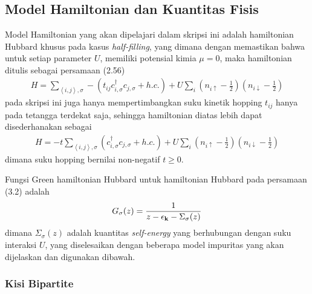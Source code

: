 \chapter{\babTiga}

\section{Model Hamiltonian dan Kuantitas Fisis}

Model Hamiltonian yang akan dipelajari dalam skripsi ini adalah hamiltonian Hubbard khusus pada kasus \textit{half-filling}, yang dimana dengan memastikan bahwa untuk setiap parameter $U$, memiliki potensial kimia $\mu = 0$, maka hamiltonian ditulis sebagai persamaan (2.56)
\begin{align}
H = \sum_{\left< i,j \right> , \sigma} -\left(t_{ij} c^\dagger_{i,\sigma}c_{j,\sigma} + h.c. \right) + U \sum_i \left( n_{i\uparrow} - \frac{1}{2}\right) \left(n_{i\downarrow} - \frac{1}{2} \right)
\end{align}
pada skripsi ini juga hanya mempertimbangkan suku kinetik hopping $t_{ij}$ hanya pada tetangga terdekat saja, sehingga hamiltonian diatas lebih dapat disederhanakan sebagai
\begin{align}
H = -t\sum_{\left< i,j \right> , \sigma} \left( c^\dagger_{i,\sigma}c_{j,\sigma} + h.c. \right) + U \sum_i \left( n_{i\uparrow} - \frac{1}{2}\right) \left(n_{i\downarrow} - \frac{1}{2} \right)
\end{align}
dimana suku hopping bernilai non-negatif $t \geq 0$. 

Fungsi Green hamiltonian Hubbard untuk hamiltonian Hubbard pada persamaan (3.2) adalah
\begin{align}
G_\sigma(z) = \frac{1}{z - \epsilon_{\textbf{k}} - \Sigma_\sigma(z)}
\end{align}
dimana $\Sigma_\sigma(z)$ adalah kuantitas \textit{self-energy} yang berhubungan dengan suku interaksi $U$, yang diselesaikan dengan beberapa model impuritas yang akan dijelaskan dan digunakan dibawah.

\subsection{Kisi Bipartite}


